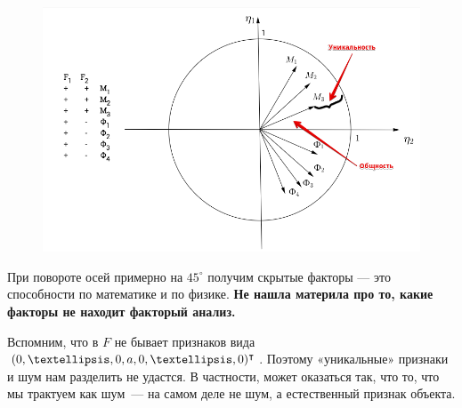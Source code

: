 \begin{ex}

	 \begin{figure}[h!]
	 	\includegraphics[scale=0.65]{img/Example.png}
	 \end{figure}
	
	
	При повороте осей примерно на $45^{\circ}$ получим скрытые факторы --- это способности по математике и по физике.
	{\bf{Не нашла материла про то, какие факторы не находит факторый анализ.}}
\end{ex}

Вспомним, что в $F$ не бывает признаков вида $\Tr{(0,…,0,a,0,…,0)}$. Поэтому «уникальные» признаки и шум нам разделить не удастся. В частности, может оказаться так, что то, что мы трактуем как шум — на самом деле не шум, а естественный признак объекта. 